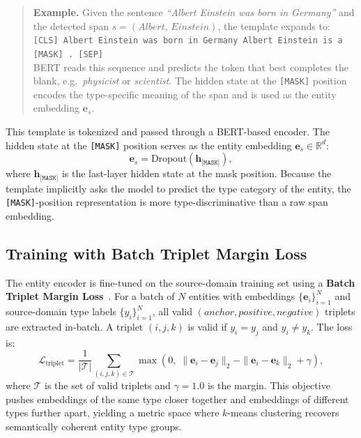 \documentclass[14pt]{extreport}
\begin{document}
\begin{quote}\small
\textbf{Example.}
Given the sentence \textit{``Albert Einstein was born in Germany''} and the detected span $s{=}(\textit{Albert},\,\textit{Einstein})$, the template expands to:\\[4pt]
\texttt{[CLS] Albert Einstein was born in Germany Albert Einstein is a [MASK] . [SEP]}\\[4pt]
BERT reads this sequence and predicts the token that best completes the blank, e.g.\ \textit{physicist} or \textit{scientist}.
The hidden state at the \texttt{[MASK]} position encodes the type-specific meaning of the span and is used as the entity embedding $\mathbf{e}_s$.
\end{quote}

This template is tokenized and passed through a BERT-based encoder. The hidden state at the \texttt{[MASK]} position serves as the entity embedding $\mathbf{e}_s \in \mathbb{R}^d$:
\begin{equation}
    \mathbf{e}_s = \text{Dropout}(\mathbf{h}_{\texttt{[MASK]}}),
    \label{eq:mask_emb}
\end{equation}
where $\mathbf{h}_{\texttt{[MASK]}}$ is the last-layer hidden state at the mask position. Because the template implicitly asks the model to predict the type category of the entity, the \texttt{[MASK]}-position representation is more type-discriminative than a raw span embedding.

\subsection{Training with Batch Triplet Margin Loss}

The entity encoder is fine-tuned on the source-domain training set using a \textbf{Batch Triplet Margin Loss}~\cite{schroff-etal-2015-facenet}. For a batch of $N$ entities with embeddings $\{\mathbf{e}_i\}_{i=1}^N$ and source-domain type labels $\{y_i\}_{i=1}^N$, all valid $(anchor, positive, negative)$ triplets are extracted in-batch. A triplet $(i, j, k)$ is valid if $y_i = y_j$ and $y_i \neq y_k$. The loss is:
\begin{equation}
    \mathcal{L}_{\text{triplet}} = \frac{1}{|\mathcal{T}|} \sum_{(i,j,k) \in \mathcal{T}} \max\!\left(0,\; \|\mathbf{e}_i - \mathbf{e}_j\|_2 - \|\mathbf{e}_i - \mathbf{e}_k\|_2 + \gamma\right),
    \label{eq:triplet}
\end{equation}
where $\mathcal{T}$ is the set of valid triplets and $\gamma = 1.0$ is the margin. This objective pushes embeddings of the same type closer together and embeddings of different types further apart, yielding a metric space where $k$-means clustering recovers semantically coherent entity type groups.
\end{document}
